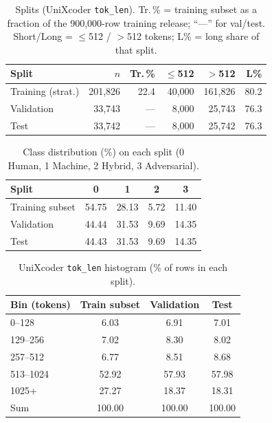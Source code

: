 \documentclass[10pt]{article}
\begin{document}
\begin{table}[htbp]
  \centering
  \footnotesize
  \setlength{\tabcolsep}{3.5pt}
  \caption{Splits (UniXcoder \texttt{tok\_len}). Tr.\,\% = training subset as a fraction of the 900{,}000-row training release; ``---'' for val/test. Short/Long = $\leq$512 / $>$512 tokens; L\% = long share of that split.}
  \label{tab:split_sizes}
  \begin{tabular}{@{}l r r r r r@{}}
    \toprule
    Split & $n$ & Tr.\,\% & $\leq$512 & $>$512 & L\% \\
    \midrule
    Training (strat.) & 201{,}826 & 22.4 & 40{,}000 & 161{,}826 & 80.2 \\
    Validation & 33{,}743 & --- & 8{,}000 & 25{,}743 & 76.3 \\
    Test & 33{,}742 & --- & 8{,}000 & 25{,}742 & 76.3 \\
    \bottomrule
  \end{tabular}
\end{table}

\begin{table}[htbp]
  \centering
  \caption{Class distribution (\%) on each split (0 Human, 1 Machine, 2 Hybrid, 3 Adversarial).}
  \label{tab:split_labels}
  \footnotesize
  \begin{tabular}{@{}lcccc@{}}
    \toprule
    Split & 0 & 1 & 2 & 3 \\
    \midrule
    Training subset & 54.75 & 28.13 & 5.72 & 11.40 \\
    Validation      & 44.44 & 31.53 & 9.69 & 14.35 \\
    Test            & 44.43 & 31.53 & 9.69 & 14.35 \\
    \bottomrule
  \end{tabular}
\end{table}

\begin{table}[htbp]
  \centering
  \caption{UniXcoder \texttt{tok\_len} histogram (\% of rows in each split).}
  \label{tab:toklen_three}
  \footnotesize
  \begin{tabular}{@{}lccc@{}}
    \toprule
    Bin (tokens) & Train subset & Validation & Test \\
    \midrule
    0--128     &  6.03 &  6.91 &  7.01 \\
    129--256   &  7.02 &  8.30 &  8.02 \\
    257--512   &  6.77 &  8.51 &  8.68 \\
    513--1024  & 52.92 & 57.93 & 57.98 \\
    1025+      & 27.27 & 18.37 & 18.31 \\
    \midrule
    Sum        & 100.00 & 100.00 & 100.00 \\
    \bottomrule
  \end{tabular}
\end{table}
\end{document}
